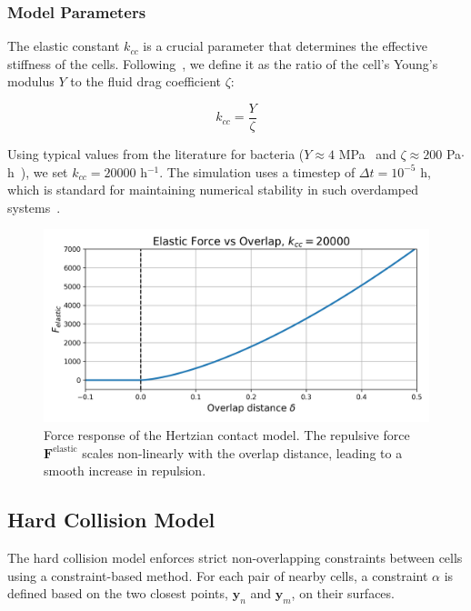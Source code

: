 \documentclass[conference]{IEEEtran}
\begin{document}
\subsubsection{Model Parameters}

The elastic constant $k_{cc}$ is a crucial parameter that determines the effective stiffness of the cells. Following~\cite{You2018}, we define it as the ratio of the cell's Young's modulus $Y$ to the fluid drag coefficient $\zeta$:

\begin{equation}
    k_{cc} = \frac{Y}{\zeta}
\end{equation}

Using typical values from the literature for bacteria ($Y \approx 4$ MPa~\cite{You2018, Blanchard2015} and $\zeta \approx 200$ Pa$\cdot$h~\cite{You2018}), we set $k_{cc} = 20000$ h$^{-1}$. The simulation uses a timestep of $\Delta t = 10^{-5}$ h, which is standard for maintaining numerical stability in such overdamped systems~\cite{Khan_2024, You2018, Blanchard2015}.

\begin{figure}[H]
    \centering
    \includegraphics[width=\linewidth]{figures/hertzian_contact_model.png}
    \caption{Force response of the Hertzian contact model. The repulsive force $\mathbf{F}^{\text{elastic}}$ scales non-linearly with the overlap distance, leading to a smooth increase in repulsion.}
    \label{fig:hertzian_contact_model}
\end{figure}

\subsection{Hard Collision Model}

The hard collision model enforces strict non-overlapping constraints between cells using a constraint-based method. For each pair of nearby cells, a constraint $\alpha$ is defined based on the two closest points, $\mathbf{y}_n$ and $\mathbf{y}_m$, on their surfaces.
\end{document}
